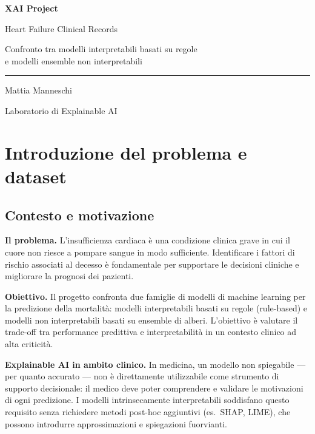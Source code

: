 \documentclass[a4paper,11pt]{article}
\begin{document}
\begin{titlepage}
  \centering
  \vspace*{3cm}
  {\Huge\bfseries\color{titlecol} XAI Project\par}
  \vspace{0.8cm}
  {\LARGE\color{accentcol} Heart Failure Clinical Records\par}
  \vspace{0.6cm}
  {\large\color{gray}
    Confronto tra modelli interpretabili basati su regole\\[4pt]
    e modelli ensemble non interpretabili\par}
  \vspace{0.5cm}
  {\color{accentcol}\rule{\textwidth}{0.8pt}}
  \vspace{1.2cm}
  {\large Mattia Manneschi\par}
  \vspace{0.3cm}
  {\normalsize Laboratorio di Explainable AI\par}
  \vspace*{\fill}
\end{titlepage}

\tableofcontents
\clearpage

\section{Introduzione del problema e dataset}

\subsection{Contesto e motivazione}

\textbf{Il problema.}
L'insufficienza cardiaca è una condizione clinica grave in cui il cuore non riesce a pompare
sangue in modo sufficiente. Identificare i fattori di rischio associati al decesso è fondamentale
per supportare le decisioni cliniche e migliorare la prognosi dei pazienti.

\textbf{Obiettivo.}
Il progetto confronta due famiglie di modelli di machine learning per la predizione della
mortalità: modelli interpretabili basati su regole (rule-based) e modelli non interpretabili
basati su ensemble di alberi. L'obiettivo è valutare il trade-off tra performance predittiva e
interpretabilità in un contesto clinico ad alta criticità.

\textbf{Explainable AI in ambito clinico.}
In medicina, un modello non spiegabile --- per quanto accurato --- non è direttamente utilizzabile
come strumento di supporto decisionale: il medico deve poter comprendere e validare le motivazioni
di ogni predizione. I modelli intrinsecamente interpretabili soddisfano questo requisito senza
richiedere metodi post-hoc aggiuntivi (es.\ SHAP, LIME), che possono introdurre approssimazioni
e spiegazioni fuorvianti.
\end{document}

